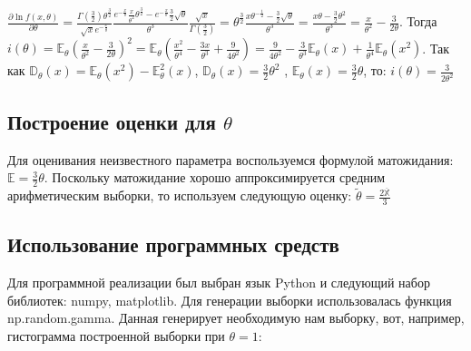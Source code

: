 \documentclass{article}
\begin{document}
    $\frac{\partial\ln{f(x, \theta)}}{\partial \theta} = \frac{\Gamma(\frac{3}{2})\theta^{\frac{3}{2}}}{\sqrt{x}e^{-\frac{x}{\theta}}} \frac{e^{-\frac{x}{\theta}} \frac{x}{\theta^2} \theta^{\frac{3}{2}} - e^{-\frac{x}{\theta}}\frac{3}{2} \sqrt{\theta}}{\theta^3} \frac{\sqrt{x}}{\Gamma(\frac{3}{2})} = \theta^{\frac{3}{2}} \frac{x\theta^{-\frac{1}{2}} - \frac{3}{2} \sqrt{\theta}}{\theta^3} = \frac{x\theta - \frac{3}{2}\theta^2}{\theta^3} = \frac{x}{\theta^2} - \frac{3}{2\theta}$. \newline
    Тогда $i(\theta) = \mathbb{E}_{\theta}(\frac{x}{\theta^2} - \frac{3}{2\theta})^2 = \mathbb{E}_{\theta} (\frac{x^2}{\theta^4} - \frac{3x}{\theta^3} + \frac{9}{4\theta^2}) = \frac{9}{4\theta^2} - \frac{3}{\theta^3} \mathbb{E}_{\theta}(x) + \frac{1}{\theta^4} \mathbb{E}_{\theta}(x^2)$. \newline \newline
    Так как $\mathbb{D}_{\theta}(x) = \mathbb{E}_{\theta}(x^2) - \mathbb{E}^{2}_{\theta}(x)$,  $\mathbb{D}_{\theta}(x) = \frac{3}{2}\theta^2$ , $\mathbb{E}_{\theta}(x) = \frac{3}{2}\theta$, то:
    \newline \newline
    $i(\theta) = \frac{3}{2\theta^2}$

    \subsection{Построение оценки для $\theta$}

    Для оценивания неизвестного параметра воспользуемся формулой матожидания: $\mathbb{E} = \frac{3}{2} \theta$. Поскольку матожидание хорошо аппроксимируется средним арифметическим выборки, то используем следующую оценку: \newline
    $\widetilde{\theta} = \frac{2\overline{\mathbb{X}}}{3}$

    \subsection{Использование программных средств}

    Для программной реализации был выбран язык Python и следующий набор библиотек: numpy, matplotlib. Для генерации выборки использовалась функция np.random.gamma. Данная генерирует необходимую нам выборку, вот, например, гистограмма построенной выборки при $\theta = 1$:
\end{document}
